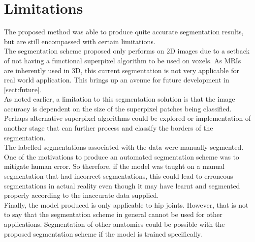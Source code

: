 \section{Limitations}
\label{sect:limit}
The proposed method was able to produce quite accurate segmentation results, but are still encompassed with certain limitations. 
\\[1\baselineskip]
The segmentation scheme proposed only performs on 2D images due to a setback of not having a functional superpixel algorithm to be used on voxels. As MRIs are inherently used in 3D, this current segmentation is not very applicable for real world application. This brings up an avenue for future development in \ref{sect:future}. 
\\[1\baselineskip]
As noted earlier, a limitation to this segmentation solution is that the image accuracy is dependent on the size of the superpixel patches being classified. Perhaps alternative superpixel algorithms could be explored or implementation of another stage that can further process and classify the borders of the segmentation.
\\[1\baselineskip]
The labelled segmentations associated with the data were manually segmented. One of the motivations to produce an automated segmentation scheme was to mitigate human error. So therefore, if the model was taught on a manual segmentation that had incorrect segmentations, this could lead to erroneous segmentations in actual reality even though it may have learnt and segmented properly according to the inaccurate data supplied.  
\\[1\baselineskip]
Finally, the model produced is only applicable to hip joints. However, that is not to say that the segmentation scheme in general cannot be used for other applications. Segmentation of other anatomies could be possible with the proposed segmentation scheme if the model is trained specifically.

